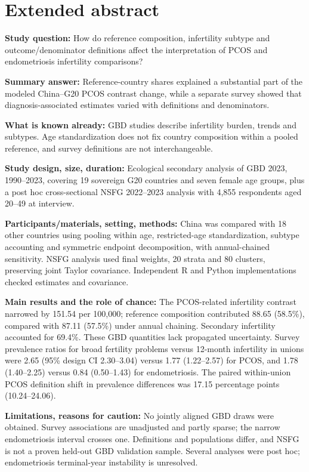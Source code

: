\section*{Extended abstract}
\textbf{Study question:} How do reference composition, infertility subtype and outcome/denominator definitions affect the interpretation of PCOS and endometriosis infertility comparisons?

\textbf{Summary answer:} Reference-country shares explained a substantial part of the modeled China--G20 PCOS contrast change, while a separate survey showed that diagnosis-associated estimates varied with definitions and denominators.

\textbf{What is known already:} GBD studies describe infertility burden, trends and subtypes. Age standardization does not fix country composition within a pooled reference, and survey definitions are not interchangeable.

\textbf{Study design, size, duration:} Ecological secondary analysis of GBD 2023, 1990--2023, covering 19 sovereign G20 countries and seven female age groups, plus a post hoc cross-sectional NSFG 2022--2023 analysis with 4,855 respondents aged 20--49 at interview.

\textbf{Participants/materials, setting, methods:} China was compared with 18 other countries using pooling within age, restricted-age standardization, subtype accounting and symmetric endpoint decomposition, with annual-chained sensitivity. NSFG analysis used final weights, 20 strata and 80 clusters, preserving joint Taylor covariance. Independent R and Python implementations checked estimates and covariance.

\textbf{Main results and the role of chance:} The PCOS-related infertility contrast narrowed by 151.54 per 100,000; reference composition contributed 88.65 (58.5\%), compared with 87.11 (57.5\%) under annual chaining. Secondary infertility accounted for 69.4\%. These GBD quantities lack propagated uncertainty. Survey prevalence ratios for broad fertility problems versus 12-month infertility in unions were 2.65 (95\% design CI 2.30--3.04) versus 1.77 (1.22--2.57) for PCOS, and 1.78 (1.40--2.25) versus 0.84 (0.50--1.43) for endometriosis. The paired within-union PCOS definition shift in prevalence differences was 17.15 percentage points (10.24--24.06).

\textbf{Limitations, reasons for caution:} No jointly aligned GBD draws were obtained. Survey associations are unadjusted and partly sparse; the narrow endometriosis interval crosses one. Definitions and populations differ, and NSFG is not a proven held-out GBD validation sample. Several analyses were post hoc; endometriosis terminal-year instability is unresolved.

